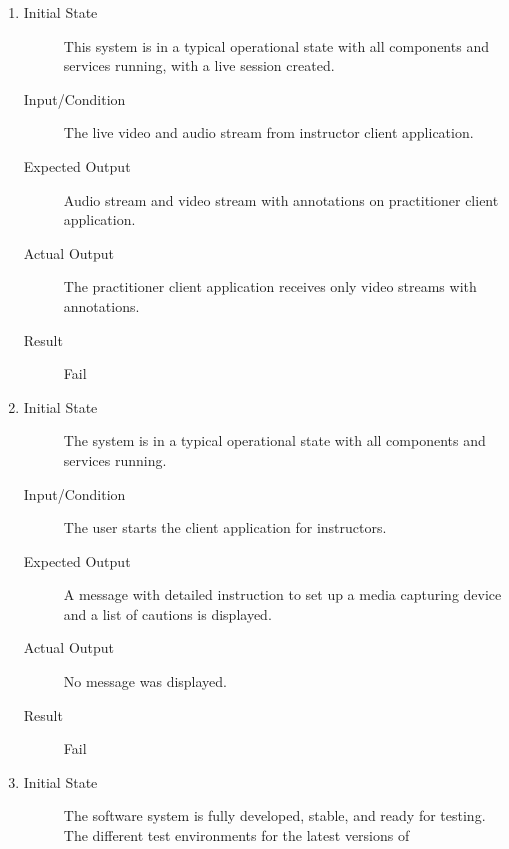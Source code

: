 \documentclass[12pt, titlepage]{article}
\begin{document}
\begin{enumerate}[NFR-T1]
  \item \label{NFRT14}
    \begin{description}
    \item[Initial State] This system is in a typical operational state with all
      components and services running, with a live session created.
    \item[Input/Condition] The live video and audio stream from instructor client
      application.
    \item[Expected Output] Audio stream and video stream with annotations on
      practitioner client application.
    \item[Actual Output] The practitioner client application receives only video 
    streams with annotations.
    \item[Result] Fail
    \end{description}
  \item \label{NFRT15}
    \begin{description}
    \item[Initial State] The system is in a typical operational state with all
      components and services running.
    \item[Input/Condition] The user starts the client application for instructors.
    \item[Expected Output] A message with detailed instruction to set up a media
      capturing device and a list of cautions is displayed.
    \item[Actual Output] No message was displayed.
    \item[Result] Fail
    \end{description}
  \item \label{NFRT16}
    \begin{description}
    \item[Initial State] The software system is fully developed, stable, and ready
      for testing. The different test environments for the latest versions of

\end{description}
\end{enumerate}
\end{document}
